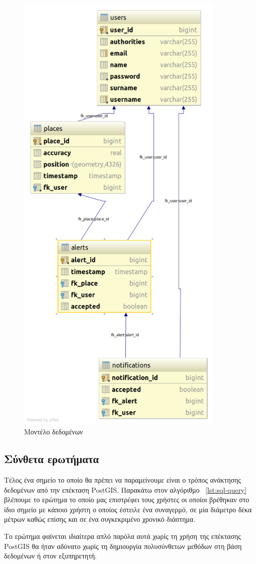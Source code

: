 \begin{figure}[h]
  \centering
  \includegraphics[width=100mm]{images/db-diagram.png}
  \caption{Μοντέλο δεδομένων}
  \label{fig:db-diagram}
\end{figure}

\clearpage

\subsection{Σύνθετα ερωτήματα}
Τέλος ένα σημείο το οποίο θα πρέπει να παραμείνουμε είναι ο τρόπος ανάκτησης δεδομένων από την επέκταση PostGIS. Παρακάτω στον αλγόριθμο ~\ref{lst:sql-query} βλέπουμε το ερώτημα το οποίο μας επιστρέφει τους χρήστες οι οποίοι βρέθηκαν στο ίδιο σημείο με κάποιο χρήστη ο οποίος έστειλε ένα συναγερμό, σε μία διάμετρο δέκα μέτρων καθώς επίσης και σε ένα συγκεκριμένο χρονικό διάστημα. 
\par
Το ερώτημα φαίνεται ιδιαίτερα απλό παρόλα αυτά χωρίς τη χρήση της επέκτασης PostGIS θα ήταν αδύνατο χωρίς τη δημιουργία πολυσύνθετων μεθόδων στη βάση δεδομένων ή στον εξυπηρετητή.

